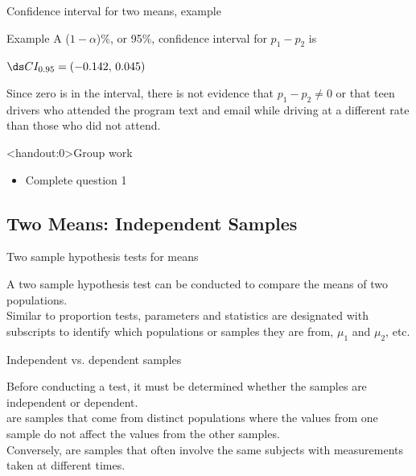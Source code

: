 \documentclass[xcolor=table, handout]{beamer}
\begin{document}
\begin{frame}{Confidence interval for two means, example}
\begin{exampleblock}{Example}
\large
A ($1-\alpha$)\%, or 95\%, confidence interval for $p_1 - p_2$ is\\
\pause\medskip
{\centering $\ds CI_{0.95} = (-0.142, \, 0.045)$ \par}
\medskip

\pause Since zero is in the interval, there is not evidence that $p_1 - p_2 \ne 0$ or that teen drivers who attended the program text and email while driving at a different rate than those who did not attend.

\end{exampleblock}
\end{frame}

\begin{frame}<handout:0>{Group work}
\begin{block}{}
\large
\begin{itemize}
\item Complete question 1
\end{itemize}
\end{block}
\end{frame}


\subsection{Two Means: Independent Samples}

\begin{frame}{Two sample hypothesis tests for means}
\begin{block}{}
\large
A two sample hypothesis test can be conducted to compare the means of two populations.\\
\pause\medskip
Similar to proportion tests, parameters and statistics are designated with subscripts to identify which populations or samples they are from, $\mu_1$ and $\mu_2$, etc.
\end{block}
\end{frame}

\begin{frame}{Independent vs. dependent samples}
\begin{block}{}
\large
Before conducting a test, it must be determined whether the samples are independent or dependent.\\
\pause\medskip
{} are samples that come from distinct populations where the values from one sample do not affect the values from the other samples.\\
\pause\medskip
Conversely,  are samples that often involve the same subjects with measurements taken at different times.
\end{block}
\end{frame}
\end{document}
